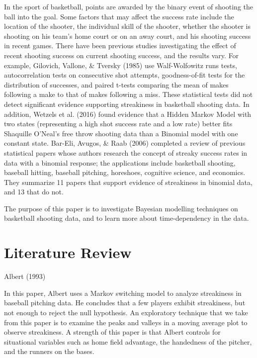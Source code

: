 \documentclass[12pt,twoside]{dukestatscithesis}
\theoremstyle{definition}
\theoremstyle{definition}
\theoremstyle{definition}
\theoremstyle{remark}
\begin{document}
In the sport of basketball, points are awarded by the binary event of
shooting the ball into the goal. Some factors that may affect the
success rate include the location of the shooter, the individual skill
of the shooter, whether the shooter is shooting on his team's home court
or on an away court, and his shooting success in recent games. There
have been previous studies investigating the effect of recent shooting
success on current shooting success, and the results vary. For example,
Gilovich, Vallone, \& Tversky (1985) use Walf-Wolfowitz runs tests,
autocorrelation tests on consecutive shot attempts, goodness-of-fit
tests for the distribution of successes, and paired t-tests comparing
the mean of makes following a make to that of makes following a miss.
These statistical tests did not detect significant evidence supporting
streakiness in basketball shooting data. In addition, Wetzels et al.
(2016) found evidence that a Hidden Markov Model with two states
(representing a high shot success rate and a low rate) better fits
Shaquille O'Neal's free throw shooting data than a Binomial model with
one constant state. Bar-Eli, Avugos, \& Raab (2006) completed a review
of previous statistical papers whose authors research the concept of
streaky success rates in data with a binomial response; the applications
include basketball shooting, baseball hitting, baseball pitching,
horeshoes, cognitive science, and economics. They summarize 11 papers
that support evidence of streakiness in binomial data, and 13 that do
not.

The purpose of this paper is to investigate Bayesian modelling
techniques on basketball shooting data, and to learn more about
time-dependency in the data.

\chapter*{Literature Review}\label{literature-review}

Albert (1993)

In this paper, Albert uses a Markov switching model to analyze
streakiness in baseball pitching data. He concludes that a few players
exhibit streakiness, but not enough to reject the null hypothesis. An
exploratory technique that we take from this paper is to examine the
peaks and valleys in a moving average plot to observe streakiness. A
strength of this paper is that Albert controls for situational variables
such as home field advantage, the handedness of the pitcher, and the
runners on the bases.
\end{document}
